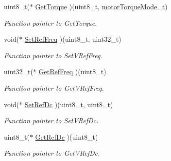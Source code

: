 \begin{DoxyCompactItemize}
\mbox{\label{structmotor_drv__t_aacf39169a8ea00d18b8b5bf28ab4e86c}} 
uint8\+\_\+t($\ast$ \mbox{\hyperlink{structmotor_drv__t_aacf39169a8ea00d18b8b5bf28ab4e86c}{Get\+Torque}} )(uint8\+\_\+t, \mbox{\hyperlink{group___torque__mode_ga41f68f90d74c690988fdd6d949c7a75d}{motor\+Torque\+Mode\+\_\+t}})
\begin{DoxyCompactList}\small\item\em Function pointer to Get\+Torque. \end{DoxyCompactList}\item 
\mbox{\label{structmotor_drv__t_a40ec050b3461e854f5f0584a2f3ba945}} 
void($\ast$ \mbox{\hyperlink{structmotor_drv__t_a40ec050b3461e854f5f0584a2f3ba945}{Set\+Ref\+Freq}} )(uint8\+\_\+t, uint32\+\_\+t)
\begin{DoxyCompactList}\small\item\em Function pointer to Set\+V\+Ref\+Freq. \end{DoxyCompactList}\item 
\mbox{\label{structmotor_drv__t_a48f04c35a870f3db8be28109eaaf62ca}} 
uint32\+\_\+t($\ast$ \mbox{\hyperlink{structmotor_drv__t_a48f04c35a870f3db8be28109eaaf62ca}{Get\+Ref\+Freq}} )(uint8\+\_\+t)
\begin{DoxyCompactList}\small\item\em Function pointer to Get\+V\+Ref\+Freq. \end{DoxyCompactList}\item 
\mbox{\label{structmotor_drv__t_a009fab793fb20bea1aba93fb48f94bee}} 
void($\ast$ \mbox{\hyperlink{structmotor_drv__t_a009fab793fb20bea1aba93fb48f94bee}{Set\+Ref\+Dc}} )(uint8\+\_\+t, uint8\+\_\+t)
\begin{DoxyCompactList}\small\item\em Function pointer to Set\+V\+Ref\+Dc. \end{DoxyCompactList}\item 
\mbox{\label{structmotor_drv__t_a2e861db84d322ee43e70a8716f82f249}} 
uint8\+\_\+t($\ast$ \mbox{\hyperlink{structmotor_drv__t_a2e861db84d322ee43e70a8716f82f249}{Get\+Ref\+Dc}} )(uint8\+\_\+t)
\begin{DoxyCompactList}\small\item\em Function pointer to Get\+V\+Ref\+Dc. \end{DoxyCompactList}\item 

\end{DoxyCompactItemize}
